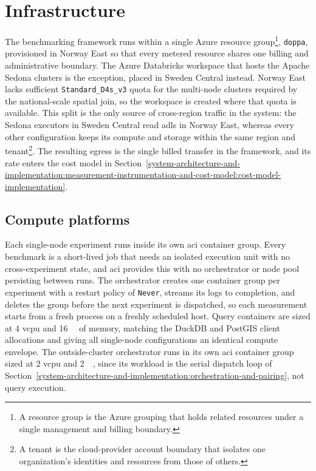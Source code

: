 \section{Infrastructure}
\label{system-architecture-and-implementation:infrastructure}

The benchmarking framework runs within a single Azure resource group\footnote{A resource group is the Azure grouping that holds related resources under a single management and billing boundary.}, \texttt{doppa}, provisioned in Norway East so that every metered resource shares one billing and administrative boundary. The Azure Databricks workspace that hosts the Apache Sedona clusters is the exception, placed in Sweden Central instead. Norway East lacks sufficient \texttt{Standard\_D4s\_v3} quota for the multi-node clusters required by the national-scale spatial join, so the workspace is created where that quota is available. This split is the only source of cross-region traffic in the system: the Sedona executors in Sweden Central read \acrshort{adls} in Norway East, whereas every other configuration keeps its compute and storage within the same region and tenant\footnote{A tenant is the cloud-provider account boundary that isolates one organization's identities and resources from those of others.}. The resulting egress is the single billed transfer in the framework, and its rate enters the cost model in Section~\ref{system-architecture-and-implementation:measurement-instrumentation-and-cost-model:cost-model-implementation}.

\subsection{Compute platforms}
\label{system-architecture-and-implementation:infrastructure:compute-platforms}

Each single-node experiment runs inside its own \acrshort{aci} container group. Every benchmark is a short-lived job that needs an isolated execution unit with no cross-experiment state, and \acrshort{aci} provides this with no orchestrator or node pool persisting between runs. The orchestrator creates one container group per experiment with a restart policy of \texttt{Never}, streams its logs to completion, and deletes the group before the next experiment is dispatched, so each measurement starts from a fresh process on a freshly scheduled host. Query containers are sized at \num{4} \acrfull{vcpu} and \SI{16}{\gibi\byte} of memory, matching the DuckDB and PostGIS client allocations and giving all single-node configurations an identical compute envelope. The outside-cluster orchestrator runs in its own \acrshort{aci} container group sized at \num{2} \acrshort{vcpu} and \SI{2}{\gibi\byte}, since its workload is the serial dispatch loop of Section~\ref{system-architecture-and-implementation:orchestration-and-pairing}, not query execution.

